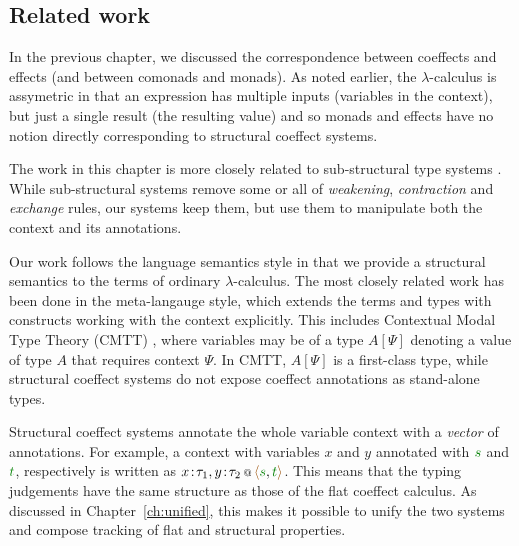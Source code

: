 
\subsection{Related work}

In the previous chapter, we discussed the correspondence between coeffects and effects (and 
between comonads and monads). As noted earlier, the $\lambda$-calculus is assymetric in that
an expression has multiple inputs (variables in the context), but just a single result 
(the resulting value) and so monads and effects have no notion directly corresponding to 
structural coeffect systems.

The work in this chapter is more closely related to sub-structural type systems \cite{substruct-attpl-intro}.
While sub-structural systems remove some or all of \emph{weakening}, \emph{contraction} and
\emph{exchange} rules, our systems keep them, but use them to manipulate both the context
and its annotations.

Our work follows the language semantics style in that we provide a structural semantics to
the terms of ordinary $\lambda$-calculus. The most closely related work has been done in the
meta-langauge style, which extends the terms and types with constructs working with the context
explicitly. This includes Contextual Modal Type Theory (CMTT) \cite{logic-cmtt}, where variables
may be of a type $A[\Psi]$ denoting a value of type $A$ that requires context $\Psi$. In CMTT, 
$A[\Psi]$ is a first-class type, while structural coeffect systems do not expose coeffect 
annotations as stand-alone types.

Structural coeffect systems annotate the whole variable context with a \emph{vector} of annotations.
For example, a context with variables $x$ and $y$ annotated with $\cclrd{s}$ and $\cclrd{t}$, 
respectively is written as $\coctx{x\!:\!\tau_1,y\!:\!\tau_2}{\alift{\cclrd{s},\cclrd{t}}}$.
This means that the typing judgements have the same structure as those of the flat coeffect
calculus. As discussed in Chapter~\ref{ch:unified}, this makes it possible to unify the two 
systems and compose tracking of flat and structural properties.



%                                                            
%                                                           

